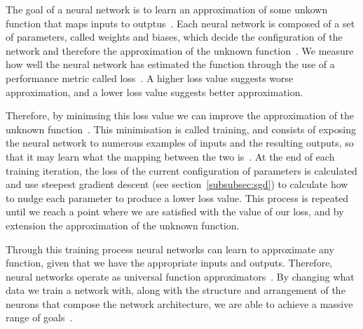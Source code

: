 The goal of a neural network is to learn an approximation of some unkown function that maps inputs to outptus~\cite{ref}. Each neural network is composed of a set of parameters, called weights and biases, which decide the configuration of the network and therefore the approximation of the unknown function~\cite{ref}. We measure how well the neural network has estimated the function through the use of a performance metric called loss~\cite{ref}. A higher loss value suggests worse approximation, and a lower loss value suggests better approximation.

Therefore, by minimsing this loss value we can improve the approximation of the unknown function~\cite{ref}. This minimisation is called training, and consists of exposing the neural network to numerous examples of inputs and the resulting outputs, so that it may learn what the mapping between the two is~\cite{ref}. At the end of each training iteration, the loss of the current configuration of parameters is calculated and use steepest gradient descent (see section~\ref{subsubsec:sgd}) to calculate how to nudge each parameter to produce a lower loss value. This process is repeated until we reach a point where we are satisfied with the value of our loss, and by extension the approximation of the unknown function.

Through this training process neural networks can learn to approximate any function, given that we have the appropriate inputs and outputs. Therefore, neural networks operate as universal function approximators~\cite{ref}. By changing what data we train a network with, along with the structure and arrangement of the neurons that compose the network architecture, we are able to achieve a massive range of goals~\cite{ref}.

